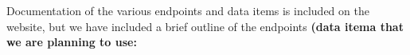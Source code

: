 \documentclass[11pt]{article}
\newcommand{\MYhref}[3][blue]{\href{#2}{\color{#1}{#3}}}%
\begin{document}

\pagebreak

\noindent 
Documentation of the various endpoints and data items is included on the \MYhref{https://covid19-docs.chrismichael.now.sh/}{Covid-19 API} website, but we have included a brief outline of the endpoints \textbf{(data itema that we are planning to use:}
\end{document}
